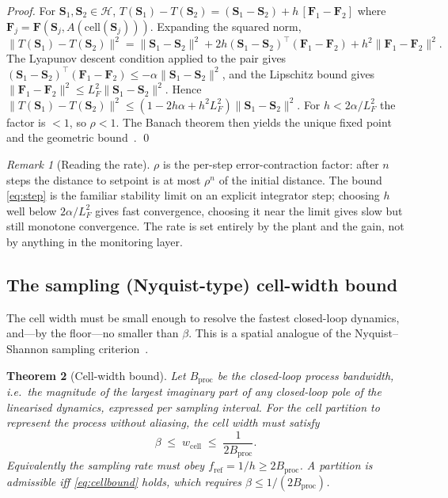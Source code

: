 \documentclass[11pt,a4paper,twocolumn]{article}
\theoremstyle{thmstyle}
\newtheorem{theorem}{Theorem}[section]
\theoremstyle{definition}
\theoremstyle{remark}
\newtheorem{remark}[theorem]{Remark}
\newcommand{\Hs}{\mathcal{H}}
\newcommand{\Ss}{\mathbf{S}}
\newcommand{\wcell}{w_{\mathrm{cell}}}
\newcommand{\floor}{\beta}
\newcommand{\Bproc}{B_{\mathrm{proc}}}
\newcommand{\fref}{f_{\mathrm{ref}}}
\newcommand{\norm}[1]{\lVert#1\rVert}
\begin{document}
\begin{proof}
For $\Ss_1,\Ss_2\in\Hs$,
$T(\Ss_1)-T(\Ss_2)=(\Ss_1-\Ss_2)+h\,[\mathbf F_1-\mathbf F_2]$ where
$\mathbf F_j=\mathbf F(\Ss_j,A(\mathrm{cell}(\Ss_j)))$. Expanding the
squared norm,
\[
\norm{T(\Ss_1)-T(\Ss_2)}^2=\norm{\Ss_1-\Ss_2}^2
+2h(\Ss_1-\Ss_2)^{\top}(\mathbf F_1-\mathbf F_2)
+h^2\norm{\mathbf F_1-\mathbf F_2}^2 .
\]
The Lyapunov descent condition applied to the pair gives
$(\Ss_1-\Ss_2)^{\top}(\mathbf F_1-\mathbf F_2)\le-\alpha\norm{\Ss_1-\Ss_2}^2$,
and the Lipschitz bound gives
$\norm{\mathbf F_1-\mathbf F_2}^2\le L_F^2\norm{\Ss_1-\Ss_2}^2$. Hence
$\norm{T(\Ss_1)-T(\Ss_2)}^2\le(1-2h\alpha+h^2L_F^2)\norm{\Ss_1-\Ss_2}^2$.
For $h<2\alpha/L_F^2$ the factor is $<1$, so $\rho<1$. The Banach theorem
then yields the unique fixed point and the geometric
bound~\citep{kreyszig1989functional}. \qed
\end{proof}

\begin{remark}[Reading the rate]
\label{rem:rate}
$\rho$ is the per-step error-contraction factor: after $n$ steps the
distance to setpoint is at most $\rho^n$ of the initial distance. The
bound \eqref{eq:step} is the familiar stability limit on an explicit
integrator step; choosing $h$ well below $2\alpha/L_F^2$ gives fast
convergence, choosing it near the limit gives slow but still monotone
convergence. The rate is set entirely by the plant and the gain, not by
anything in the monitoring layer.
\end{remark}

\subsection{The sampling (Nyquist-type) cell-width bound}

The cell width must be small enough to resolve the fastest closed-loop
dynamics, and---by the floor---no smaller than $\floor$. This is a
spatial analogue of the Nyquist--Shannon sampling
criterion~\citep{shannon1948mathematical,astrom2008feedback}.

\begin{theorem}[Cell-width bound]
\label{thm:nyquist}
Let $\Bproc$ be the closed-loop process bandwidth, i.e.\ the magnitude of
the largest imaginary part of any closed-loop pole of the linearised
dynamics, expressed per sampling interval. For the cell partition to
represent the process without aliasing, the cell width must satisfy
\begin{equation}
\label{eq:cellbound}
\floor\;\le\;\wcell\;\le\;\frac{1}{2\Bproc}.
\end{equation}
Equivalently the sampling rate must obey $\fref=1/h\ge2\Bproc$. A
partition is \emph{admissible} iff \eqref{eq:cellbound} holds, which
requires $\floor\le 1/(2\Bproc)$.
\end{theorem}
\end{document}
